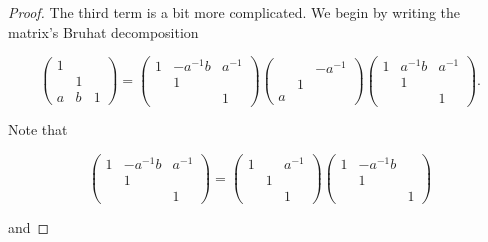 \documentclass[12pt,reqno]{amsart}
\theoremstyle{definition}
\theoremstyle{remark}
\numberwithin{equation}{section}
\begin{document}
\begin{proof}
    The third term is a bit more complicated. We begin by writing the matrix's Bruhat decomposition

    \begin{equation*}
        \begin{pmatrix}
            1 & & \\
            & 1 &\\
            a & b & 1
        \end{pmatrix} = \begin{pmatrix}
            1 & -a^{-1}b & a^{-1} \\
            & 1 & \\
            & & 1
        \end{pmatrix} \begin{pmatrix}
            & & -a^{-1}\\
            & 1 &\\
            a & &
        \end{pmatrix} \begin{pmatrix}
            1 & a^{-1}b & a^{-1}\\
            & 1 & \\
            & & 1
        \end{pmatrix}.
    \end{equation*}

    Note that

    \begin{equation*}
        \begin{pmatrix}
            1 & -a^{-1}b & a^{-1} \\
            & 1 & \\
            & & 1
        \end{pmatrix} = \begin{pmatrix}
            1 & & a^{-1}\\
            & 1 & \\
            & & 1
        \end{pmatrix} \begin{pmatrix}
            1 & -a^{-1}b &\\
            & 1 & \\
            & & 1
        \end{pmatrix}
    \end{equation*}

    and 


\end{proof}
\end{document}
